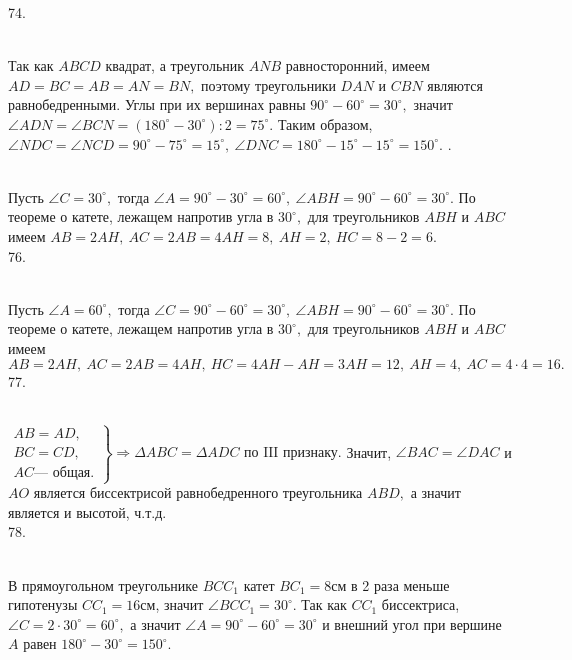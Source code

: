 74.  \begin{figure}[ht!]
\end{figure}\\
Так как $ABCD$ квадрат, а треугольник $ANB$ равносторонний, имеем $AD=BC=AB=AN=BN,$ поэтому треугольники $DAN$ и $CBN$ являются равнобедренными. Углы при их вершинах равны $90^\circ-60^\circ=30^\circ,$ значит $\angle ADN=\angle BCN=(180^\circ-30^\circ):2=75^\circ.$ Таким образом, $\angle NDC=\angle NCD=90^\circ-75^\circ=15^\circ,\ \angle DNC=180^\circ-15^\circ-15^\circ=150^\circ.$\newpage
{}. \begin{figure}[ht!]
\end{figure}\\
Пусть $\angle C=30^\circ,$ тогда $\angle A=90^\circ-30^\circ=60^\circ,\ \angle ABH=90^\circ-60^\circ=30^\circ.$ По теореме о катете, лежащем напротив угла в $30^\circ,$ для треугольников $ABH$ и $ABC$ имеем $AB=2AH,\ AC=2AB=4AH=8,\ AH=2,\ HC=8-2=6.$\\
76. \begin{figure}[ht!]
\end{figure}\\
Пусть $\angle A=60^\circ,$ тогда $\angle C=90^\circ-60^\circ=30^\circ,\ \angle ABH=90^\circ-60^\circ=30^\circ.$ По теореме о катете, лежащем напротив угла в $30^\circ,$ для треугольников $ABH$ и $ABC$ имеем $AB=2AH,\ AC=2AB=4AH,\ HC=4AH-AH=3AH=12,\ AH=4,\ AC=4\cdot4=16.$\\
77. \begin{figure}[ht!]
\end{figure}\\
$\left.\begin{array}{l}AB=AD,\\
BC=CD,\\
AC\text{--- общая.}  \end{array}\right\}\Rightarrow \Delta ABC=\Delta ADC\text{ по III признаку.}$ Значит, $\angle BAC=\angle DAC$ и $AO$ является биссектрисой равнобедренного треугольника $ABD,$ а значит является и высотой, ч.т.д.\\
78. \begin{figure}[ht!]
\end{figure}\\
В прямоугольном треугольнике $BCC_1$ катет $BC_1=8$см в 2 раза меньше гипотенузы $CC_1=16$см, значит $\angle BCC_1=30^\circ.$ Так как $CC_1$ биссектриса, $\angle C=2\cdot30^\circ=60^\circ,$ а значит $\angle A=90^\circ-60^\circ=30^\circ$ и внешний угол при вершине $A$ равен $180^\circ-30^\circ=150^\circ.$\\
